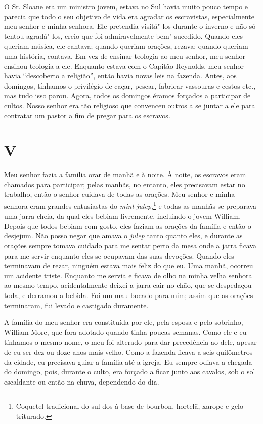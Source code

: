 O Sr. Sloane era um ministro jovem, estava no Sul havia muito pouco
tempo e parecia que todo o seu objetivo de vida era agradar os
escravistas, especialmente meu senhor e minha senhora. Ele pretendia
visitá"-los durante o inverno e não só tentou agradá"-los, creio que foi
admiravelmente bem"-sucedido. Quando eles queriam música, ele cantava;
quando queriam orações, rezava; quando queriam uma história, contava. Em
vez de ensinar teologia ao meu senhor, meu senhor ensinou teologia a
ele. Enquanto estava com o Capitão Reynolds, meu senhor havia
``descoberto a religião'', então havia novas leis na fazenda. Antes, aos
domingos, tínhamos o privilégio de caçar, pescar, fabricar vassouras e
cestos etc., mas tudo isso parou. Agora, todos os domingos éramos
forçados a participar de cultos. Nosso senhor era tão religioso que
convenceu outros a se juntar a ele para contratar um pastor a fim de
pregar para os escravos.

\chapter{V}

Meu senhor fazia a família orar de manhã e à noite. À noite, os escravos
eram chamados para participar; pelas manhãs, no entanto, eles precisavam
estar no trabalho, então o senhor cuidava de todas as orações. Meu
senhor e minha senhora eram grandes entusiastas do \emph{mint
julep},\footnote{Coquetel tradicional do sul dos  à base de bourbon,
  hortelã, xarope e gelo triturado.} e todas as manhãs se preparava uma
jarra cheia, da qual eles bebiam livremente, incluindo o jovem William.
Depois que todos bebiam com gosto, eles faziam as orações da família e
então o desjejum. Não posso negar que amava o \emph{julep} tanto quanto
eles, e durante as orações sempre tomava cuidado para me sentar perto da
mesa onde a jarra ficava para me servir enquanto eles se ocupavam das
suas devoções. Quando eles terminavam de rezar, ninguém estava mais
feliz do que eu. Uma manhã, ocorreu um acidente triste. Enquanto me
servia e ficava de olho na minha velha senhora ao mesmo tempo,
acidentalmente deixei a jarra cair no chão, que se despedaçou toda, e
derramou a bebida. Foi um mau bocado para mim; assim que as orações
terminaram, fui levado e castigado duramente.

A família do meu senhor era constituída por ele, pela esposa e pelo
sobrinho, William More, que fora adotado quando tinha poucas semanas.
Como ele e eu tínhamos o mesmo nome, o meu foi alterado para dar
precedência ao dele, apesar de eu ser dez ou doze anos mais velho. Como
a fazenda ficava a seis quilômetros da cidade, eu precisava guiar a
família até a igreja. Eu sempre odiava a chegada do domingo, pois,
durante o culto, era forçado a ficar junto aos cavalos, sob o sol
escaldante ou então na chuva, dependendo do dia.

